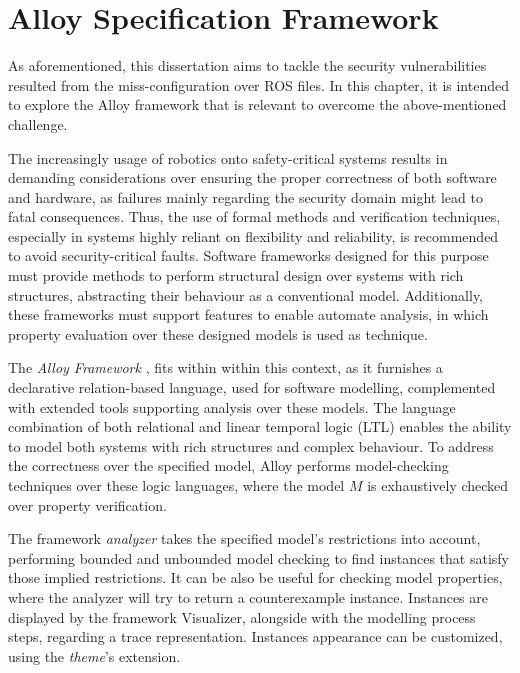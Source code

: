 \chapter{Alloy Specification Framework}\label{c:alloy}

As aforementioned, this dissertation aims to tackle the security vulnerabilities resulted from the miss-configuration over ROS files. In this chapter, it is intended to explore the Alloy framework that is relevant to overcome the above-mentioned challenge. %

The increasingly usage of robotics onto safety-critical systems results in demanding considerations over ensuring the proper correctness of both software and hardware, as failures mainly regarding the security domain might lead to fatal consequences. Thus, the use of formal methods and verification techniques, especially in systems highly reliant on flexibility and reliability, is recommended to avoid security-critical faults. \cite{clarke2011model} Software frameworks designed for this purpose must provide methods to perform structural design over systems with rich structures, abstracting their behaviour as a conventional model. Additionally, these frameworks must support features to enable automate analysis, in which property evaluation over these designed models is used as technique. 

The \textit{Alloy Framework} \cite{alloy-DJ}, fits within within this context, as it furnishes a declarative relation-based language, used for software modelling, complemented with extended tools supporting analysis over these models. \cite{alloy-6} The language combination of both relational and linear temporal logic (LTL) enables the ability to model both systems with rich structures and complex behaviour. To address the correctness over the specified model, Alloy performs model-checking techniques over these logic languages, where the model $M$ is exhaustively checked over property verification. \cite{lwspecification}

The framework \textit{analyzer} takes the specified model's restrictions into account, performing bounded and unbounded model checking to find instances that satisfy those implied restrictions. It can be also be useful for checking model properties, where the analyzer will try to return a counterexample instance. Instances are displayed by the framework Visualizer, alongside with the modelling process steps, regarding a trace representation. Instances appearance can be customized, using the \textit{theme}'s extension. \cite{alloy-6}

